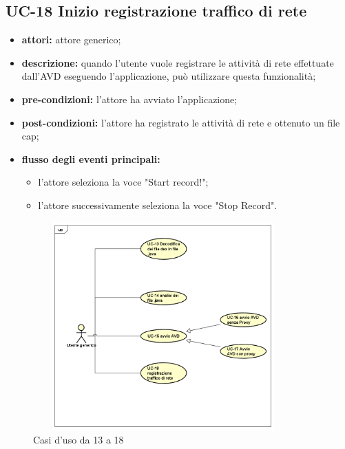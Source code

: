 \subsection*{UC-18 Inizio registrazione traffico di rete}\label{subsec:uc-18-inizio-registrazione-traffico-di-rete}
\begin{itemize}
    \item \textbf{attori:} attore generico;
    \item \textbf{descrizione:} quando l'utente vuole registrare le attività di rete effettuate dall'AVD eseguendo l'applicazione, può utilizzare questa funzionalità;
    \item \textbf{pre-condizioni:} l'attore ha avviato l'applicazione;
    \item \textbf{post-condizioni:} l'attore ha registrato le attività di rete e ottenuto un file cap;
    \item \textbf{flusso degli eventi principali:}
    \begin{itemize}
        \item l'attore seleziona la voce "Start record!";
        \item l'attore successivamente seleziona la voce "Stop Record".
    \end{itemize}
\end{itemize}
\begin{figure}[H]
    \centering
    \includegraphics[width=10cm, height=8cm]{./immagini/usecase/UC-13_14.png}
    \caption{Casi d'uso da 13 a 18}
\end{figure}

